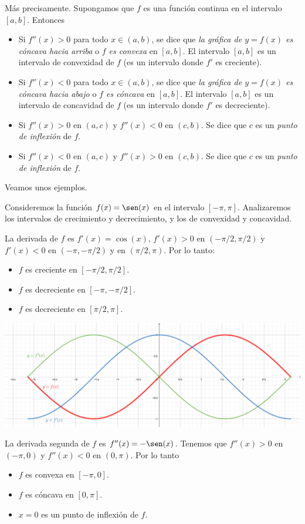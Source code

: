 Más precisamente. Supongamos que $f$ es una función continua en el intervalo $[a,b]$. Entonces
\begin{itemize}
    \item Si $f''(x)>0$ para todo $x\in(a,b)$, se dice que \emph{la gráfica de $y=f(x)$ es cóncava hacia arriba} o \emph{$f$ es convexa} en $[a,b]$. El intervalo $[a,b]$ es un intervalo de convexidad de $f$ (es un intervalo donde $f'$ es creciente).
    \item Si $f''(x)<0$ para todo $x\in(a,b)$, se dice que \emph{la gráfica de $y=f(x)$ es cóncava hacia abajo} o \emph{$f$ es cóncava} en $[a,b]$. El intervalo $[a,b]$ es un intervalo de concavidad de $f$ (es un intervalo donde $f'$ es decreciente).
    \item Si $f''(x)>0$ en $(a,c)$ y $f''(x)<0$ en $(c,b)$. Se dice que $c$ es un \emph{punto de inflexión} de $f$.
    \item Si $f''(x)<0$ en $(a,c)$ y $f''(x)>0$ en $(c,b)$. Se dice que $c$ es un \emph{punto de inflexión} de $f$.
\end{itemize}

Veamos unos ejemplos.
\begin{example}
    Consideremos la función $f(x) = \sen(x)$ en el intervalo $[-\pi,\pi]$. Analizaremos los intervalos de crecimiento y decrecimiento, y los de convexidad y concavidad.

    La derivada de $f$ es $f'(x)=\cos(x)$, $f'(x)>0$ en $(-\pi/2,\pi/2)$ y $f'(x)<0$ en $(-\pi,-\pi/2)$ y en $(\pi/2,\pi)$. Por lo tanto:
    \begin{itemize}
        \item $f$ es creciente en $[-\pi/2,\pi/2]$.
        \item $f$ es decreciente en $[-\pi,-\pi/2]$.
        \item $f$ es decreciente en $[\pi/2,\pi]$.
    \end{itemize}

    \centerline{\includegraphics[width=.8\textwidth]{pics/concavidad-convexidad-seno.png}}

    La derivada segunda de $f$ es $f''(x)=-\sen(x)$. Tenemos que $f''(x)>0$ en $(-\pi,0)$ y $f''(x)<0$ en $(0,\pi)$. Por lo tanto
    \begin{itemize}
        \item $f$ es convexa en $[-\pi,0]$.
        \item $f$ es cóncava en $[0,\pi]$.
        \item $x=0$ es un punto de inflexión de $f$.
    \end{itemize}
\end{example}

